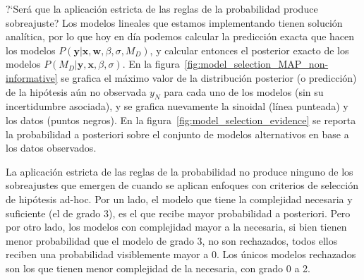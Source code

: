 \documentclass[a4paper,11pt]{book}
\theoremstyle{definition}
\begin{document}
%
%



?`Será que la aplicaci\'on estricta de las reglas de la probabilidad produce sobreajuste?
%
Los modelos lineales que estamos implementando tienen soluci\'on anal\'itica, por lo que hoy en d\'ia podemos calcular la predicci\'on exacta que hacen los modelos $P(\bm{y}|\bm{x}, \bm{w}, \beta, \sigma, M_D)$, y calcular entonces el posterior exacto de los modelos $P(M_D|\bm{y},\bm{x}, \beta, \sigma)$.
%
En la figura~\ref{fig:model_selection_MAP_non-informative} se grafica el máximo valor de la distribución posterior (o predicción) de la hipótesis aún no observada $y_N$ para cada uno de los modelos (sin su incertidumbre asociada), y se grafica nuevamente la sinoidal (l\'inea punteada) y los datos (puntos negros).
%
En la figura~\ref{fig:model_selection_evidence} se reporta la probabilidad a posteriori sobre el conjunto de modelos alternativos en base a los datos observados.


La aplicación estricta de las reglas de la probabilidad no produce ninguno de los sobreajustes que emergen de cuando se aplican enfoques con criterios de selección de hipótesis ad-hoc.
%
Por un lado, el modelo que tiene la complejidad necesaria y suficiente (el de grado 3), es el que recibe mayor probabilidad a posteriori.
%
Pero por otro lado, los modelos con complejidad mayor a la necesaria, si bien tienen menor probabilidad que el modelo de grado 3, no son rechazados, todos ellos reciben una probabilidad visiblemente mayor a 0.
%
Los \'unicos modelos rechazados son los que tienen menor complejidad de la necesaria, con grado 0 a 2.
\end{document}
